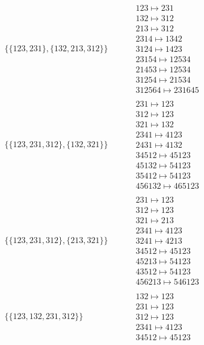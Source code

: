 \begin{tiny}
\begin{align}
\begin{matrix}
\end{matrix}
\\
\{\{123, 231\}, \{132, 213, 312\}\}
\quad
&
\phantom{.}
&
\begin{matrix}
123 \mapsto 231\\132 \mapsto 312\\213 \mapsto 312\\2314 \mapsto 1342\\3124 \mapsto 1423\\23154 \mapsto 12534\\21453 \mapsto 12534\\31254 \mapsto 21534\\312564 \mapsto 231645
\end{matrix}
\\
\{\{123, 231, 312\}, \{132, 321\}\}
\quad
&
\phantom{.}
&
\begin{matrix}
231 \mapsto 123\\312 \mapsto 123\\321 \mapsto 132\\2341 \mapsto 4123\\2431 \mapsto 4132\\34512 \mapsto 45123\\45132 \mapsto 54123\\35412 \mapsto 54123\\456132 \mapsto 465123
\end{matrix}
\\
\{\{123, 231, 312\}, \{213, 321\}\}
\quad
&
\phantom{.}
&
\begin{matrix}
231 \mapsto 123\\312 \mapsto 123\\321 \mapsto 213\\2341 \mapsto 4123\\3241 \mapsto 4213\\34512 \mapsto 45123\\45213 \mapsto 54123\\43512 \mapsto 54123\\456213 \mapsto 546123
\end{matrix}
\\
\{\{123, 132, 231, 312\}\}
\quad
&
\phantom{.}
&
\begin{matrix}
132 \mapsto 123\\231 \mapsto 123\\312 \mapsto 123\\2341 \mapsto 4123\\34512 \mapsto 45123
\end{matrix}

\end{align}
\end{tiny}
